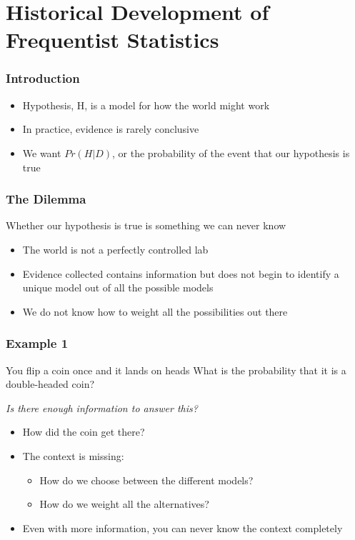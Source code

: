 \documentclass[12pt, block=fill]{beamer}
\begin{document}



\section{Historical Development of Frequentist Statistics}
\begin{frame}
  \frametitle{Introduction}
  \begin{itemize}
    \item Hypothesis, H, is a model for how the world might work
    \item In practice, evidence is rarely conclusive
    \item We want $Pr(H|D)$, or the probability of the event that our hypothesis is true
  \end{itemize}
\end{frame}


\begin{frame}
  \frametitle{The Dilemma}
     Whether our hypothesis is true is something we can never know 
  \begin{itemize}
    \item The world is not a perfectly controlled lab
    \item Evidence collected contains information but does not begin to identify a unique model out of all the possible models
    \item We do not know how to weight all the possibilities out there
  \end{itemize}
\end{frame}

\begin{frame}
  \frametitle{Example 1}
  \begin{exampleblock}{You flip a coin once and it lands on heads}
    What is the probability that it is a double-headed coin?
  \end{exampleblock}
  \textit{Is there enough information to answer this?}
  \begin{itemize}
    \item How did the coin get there?
    \item The context is missing:
    \begin{itemize}
        \item How do we choose between the different models?
        \item How do we weight all the alternatives?
    \end{itemize}  
    \item Even with more information, you can never know the context completely
  \end{itemize}
\end{frame}
\end{document}
